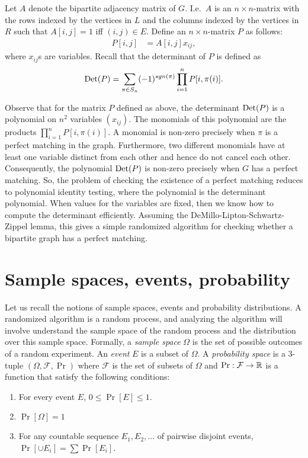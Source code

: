 Let $A$ denote the bipartite adjacency matrix of $G$. I.e.\ $A$ is an $n\times n$-matrix with the rows indexed by the vertices in $L$ and the columns indexed by the vertices in $R$ such that $A[i,j] = 1$ iff $(i,j)\in E$. Define an $n\times n$-matrix $P$ as follows:
\begin{align*}
	P[i,j] &= A[i,j]x_{ij},
\end{align*}
where $x_{ij}$s are variables. Recall that the determinant of $P$ is defined as
\begin{align*}
	\operatorname{Det}(P) = \sum_{\pi \in S_n} (-1)^{sgn(\pi)} \prod_{i=1}^n P[i,\pi(i)].
\end{align*}

Observe that for the matrix $P$ defined as above, the determinant $\operatorname{Det}(P)$ is a polynomial on $n^2$ variables $(x_{ij})$. The monomials of this polynomial are the products $\prod_{i=1}^n P[i,\pi(i)]$. A monomial is non-zero precisely when $\pi$ is a perfect matching in the graph. Furthermore, two different monomials have at least one variable distinct from each other and hence do not cancel each other. Consequently, the polynomial $\operatorname{Det}(P)$ is non-zero precisely when $G$ has a perfect matching. So, the problem of checking the existence of a perfect matching reduces to polynomial identity testing, where the polynomial is the determinant polynomial. When values for the variables are fixed, then we know how to compute the determinant efficiently. Assuming the DeMillo-Lipton-Schwartz-Zippel lemma, this gives a simple randomized algorithm for checking whether a bipartite graph has a perfect matching.
\section{Sample spaces, events, probability}

Let us recall the notions of sample spaces, events and probability distributions. A randomized algorithm is a random process, and analyzing the algorithm will involve understand the sample space of the random process and the distribution over this sample space. Formally, a \textit{sample space} $\Omega$ is the set of possible outcomes of a random experiment. An \textit{event} $E$ is a subset of $\Omega$. A \textit{probability space} is a $3$-tuple $(\Omega, \mathcal{F},\Pr)$ where $\mathcal{F}$ is the set of subsets of $\Omega$ and $\Pr:\mathcal{F} \to \mathbb{R}$ is a function that satisfy the following conditions:
\begin{enumerate}
	\item For every event $E$, $0 \leq \Pr[E] \leq 1$.
	\item $\Pr[\Omega] = 1$
	\item For any countable sequence $E_1, E_2, \ldots $ of pairwise disjoint events, $\Pr[\cup E_i] = \sum \Pr[E_i]$.
\end{enumerate}

